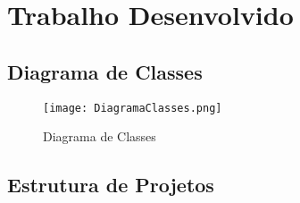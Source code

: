 \documentclass[11pt]{scrartcl} %
\begin{document}
\newpage

\section{Trabalho Desenvolvido}
\subsection{Diagrama de Classes}
\begin{figure}[h] %
	\centering
	\texttt{[image: DiagramaClasses.png]} %
	\caption{Diagrama de Classes}
\end{figure}

\newpage

\subsection{Estrutura de Projetos}
\end{document}
